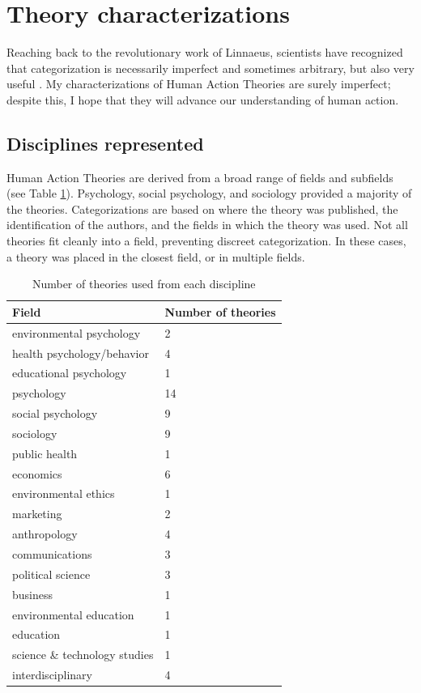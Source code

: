 \documentclass[12 pt]{article}
\begin{document}
\section{Theory characterizations}
 Reaching back to the revolutionary work of Linnaeus, scientists have recognized that categorization is necessarily imperfect and sometimes arbitrary, but also very useful \parencite{Dear2006}. My characterizations of Human Action Theories are surely imperfect; despite this, I hope that they will advance our understanding of human action. 
\subsection{Disciplines represented}
Human Action Theories are derived from a broad range of fields and subfields (see Table \ref{tab:fields}). Psychology, social psychology, and sociology provided a majority of the theories. Categorizations are based on where the theory was published, the identification of the authors, and the fields in which the theory was used. Not all theories fit cleanly into a field, preventing discreet categorization. In these cases, a theory was placed in the closest field, or in multiple fields. 
\begin{center}
	\begin{table}
		\centering
		\caption {Number of theories used from each discipline} \label{tab:fields}  
		\begin{tabular}{|l | l|}
			\hline 
			\textbf{Field} & \textbf{Number of theories} \\
			\hline
			environmental psychology & 2\\
			health psychology/behavior & 4\\
			educational psychology & 1 \\
			psychology & 14 \\
			social psychology & 9 \\
			sociology & 9  \\	  
			public health & 1 \\ 
			economics & 6 \\
			environmental ethics & 1 \\
			marketing & 2 \\
			anthropology & 4 \\
			communications & 3 \\
			political science & 3 \\
			business & 1 \\
			environmental education & 1 \\ 
			education & 1 \\
			science \& technology studies & 1 \\ 
			interdisciplinary & 4 \\
			\hline
			\hline
		\end{tabular}
	\end{table}
\end{center}
\end{document}
